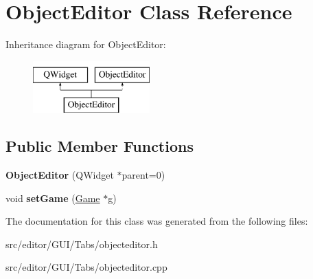 \hypertarget{class_object_editor}{\section{\-Object\-Editor \-Class \-Reference}
\label{class_object_editor}
}
\-Inheritance diagram for \-Object\-Editor\-:\begin{figure}[H]
\begin{center}
\leavevmode
\includegraphics[height=2.000000cm]{class_object_editor}
\end{center}
\end{figure}
\subsection*{\-Public \-Member \-Functions}
\begin{DoxyCompactItemize}
\item 
\hypertarget{class_object_editor_a7a84cedc42e8c15e3c461e7b6db2f196}{{\bfseries \-Object\-Editor} (\-Q\-Widget $\ast$parent=0)}\label{class_object_editor_a7a84cedc42e8c15e3c461e7b6db2f196}

\item 
\hypertarget{class_object_editor_ae6402ec2acc0b45b142bf61eff453b7e}{void {\bfseries set\-Game} (\hyperlink{class_game}{\-Game} $\ast$g)}\label{class_object_editor_ae6402ec2acc0b45b142bf61eff453b7e}

\end{DoxyCompactItemize}


\-The documentation for this class was generated from the following files\-:\begin{DoxyCompactItemize}
\item 
src/editor/\-G\-U\-I/\-Tabs/objecteditor.\-h\item 
src/editor/\-G\-U\-I/\-Tabs/objecteditor.\-cpp\end{DoxyCompactItemize}
